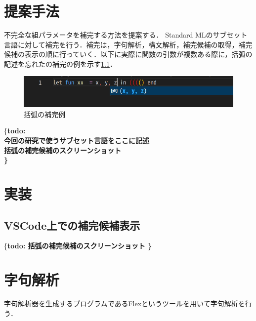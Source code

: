 \documentclass[12pt,a4j]{jreport}
\newcommand{\todo}[1]{{\{\bf todo: #1\}}}
\begin{document}
\chapter{提案手法}

不完全な組パラメータを補完する方法を提案する．
Standard MLのサブセット言語に対して補完を行う．補完は，字句解析，構文解析，補完候補の取得，補完候補の表示の順に行っていく．以下に実際に関数の引数が複数ある際に，括弧の記述を忘れたの補完の例を示す\ref{CodeCompletionDemo}．

\begin{figure}[H]
    \centering
    \includegraphics[width=15cm]{img/SampleComplete.png}
    \caption{括弧の補完例}
    \label{CodeCompletionDemo}
\end{figure}

\todo{
    \\
    今回の研究で使うサブセット言語をここに記述\\
    括弧の補完候補のスクリーンショット\\ 
}




\chapter{実装}

\section{VSCode上での補完候補表示}
\todo{
    括弧の補完候補のスクリーンショット
}



\chapter{字句解析}
字句解析器を生成するプログラムであるFlex\cite{flex}というツールを用いて字句解析を行う．





\end{document}
